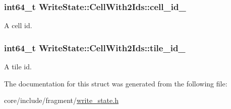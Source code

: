 \subsubsection[{cell\+\_\+id\+\_\+}]{\setlength{\rightskip}{0pt plus 5cm}int64\+\_\+t Write\+State\+::\+Cell\+With2\+Ids\+::cell\+\_\+id\+\_\+}\label{structWriteState_1_1CellWith2Ids_ac3726ff7485d0a1d8a3050235a6e44a2}
A cell id. \hypertarget{structWriteState_1_1CellWith2Ids_a8f1fc12280b0a6fea8d5298f99599d58}{}
\subsubsection[{tile\+\_\+id\+\_\+}]{\setlength{\rightskip}{0pt plus 5cm}int64\+\_\+t Write\+State\+::\+Cell\+With2\+Ids\+::tile\+\_\+id\+\_\+}\label{structWriteState_1_1CellWith2Ids_a8f1fc12280b0a6fea8d5298f99599d58}
A tile id. 

The documentation for this struct was generated from the following file\+:\begin{DoxyCompactItemize}
\item 
core/include/fragment/\hyperlink{write__state_8h}{write\+\_\+state.\+h}\end{DoxyCompactItemize}
